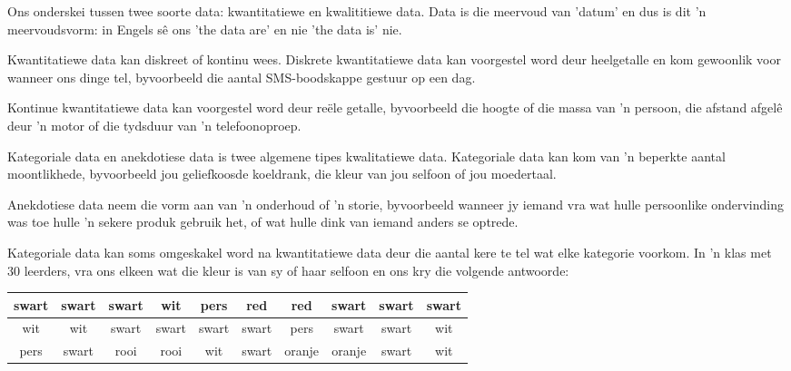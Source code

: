 Ons onderskei tussen twee soorte data: kwantitatiewe en kwalititiewe data. Data is die meervoud van 'datum' en dus is dit 'n meervoudsvorm: in Engels s\^e ons 'the data are' en nie 'the data is' nie.


Kwantitatiewe data kan diskreet of kontinu wees. Diskrete kwantitatiewe data kan voorgestel word deur heelgetalle en kom gewoonlik voor wanneer ons dinge tel, byvoorbeeld die aantal SMS-boodskappe gestuur op een dag.\par

Kontinue kwantitatiewe data kan voorgestel word deur re\"ele getalle, byvoorbeeld die hoogte of die massa van 'n persoon, die afstand afgel\^e deur 'n motor of die tydsduur van 'n telefoonoproep.


Kategoriale data en anekdotiese data is twee algemene tipes kwalitatiewe data. Kategoriale data kan kom van ’n beperkte aantal moontlikhede, byvoorbeeld jou geliefkoosde koeldrank, die kleur van jou selfoon of jou moedertaal. \par

Anekdotiese data neem die vorm aan van ’n onderhoud of ’n storie, byvoorbeeld wanneer jy iemand vra wat hulle persoonlike ondervinding was toe hulle ’n sekere produk gebruik het, of wat hulle dink van iemand anders se optrede. \par

Kategoriale data kan soms omgeskakel word na kwantitatiewe data deur die aantal kere te tel wat elke kategorie voorkom. In ’n klas met $30$ leerders, vra ons elkeen wat die kleur is van sy of haar selfoon en ons kry die volgende antwoorde:

  \begin{center}
    \begin{tabular}{|c|c|c|c|c|c|c|c|c|c|}\hline
     
      swart & swart & swart & wit & pers & red & red & swart & swart & swart \\ \hline
      wit & wit & swart & swart & swart & swart & pers & swart & swart & wit \\ \hline
      pers & swart & rooi & rooi & wit & swart & oranje & oranje & swart & wit \\ \hline
     
    \end{tabular}
  \end{center}

